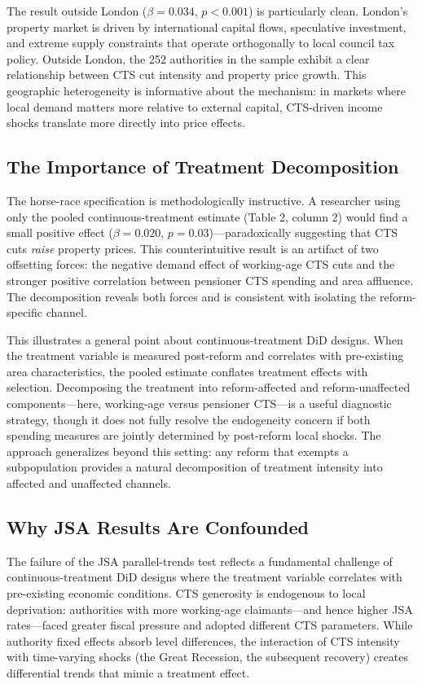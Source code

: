 \documentclass[12pt]{article}
\begin{document}
The result outside London ($\beta = 0.034$, $p < 0.001$) is particularly clean. London's property market is driven by international capital flows, speculative investment, and extreme supply constraints that operate orthogonally to local council tax policy. Outside London, the 252 authorities in the sample exhibit a clear relationship between CTS cut intensity and property price growth. This geographic heterogeneity is informative about the mechanism: in markets where local demand matters more relative to external capital, CTS-driven income shocks translate more directly into price effects.

\subsection{The Importance of Treatment Decomposition}

The horse-race specification is methodologically instructive. A researcher using only the pooled continuous-treatment estimate (Table 2, column 2) would find a small positive effect ($\beta = 0.020$, $p = 0.03$)---paradoxically suggesting that CTS cuts \textit{raise} property prices. This counterintuitive result is an artifact of two offsetting forces: the negative demand effect of working-age CTS cuts and the stronger positive correlation between pensioner CTS spending and area affluence. The decomposition reveals both forces and is consistent with isolating the reform-specific channel.

This illustrates a general point about continuous-treatment DiD designs. When the treatment variable is measured post-reform and correlates with pre-existing area characteristics, the pooled estimate conflates treatment effects with selection. Decomposing the treatment into reform-affected and reform-unaffected components---here, working-age versus pensioner CTS---is a useful diagnostic strategy, though it does not fully resolve the endogeneity concern if both spending measures are jointly determined by post-reform local shocks. The approach generalizes beyond this setting: any reform that exempts a subpopulation provides a natural decomposition of treatment intensity into affected and unaffected channels.

\subsection{Why JSA Results Are Confounded}

The failure of the JSA parallel-trends test reflects a fundamental challenge of continuous-treatment DiD designs where the treatment variable correlates with pre-existing economic conditions. CTS generosity is endogenous to local deprivation: authorities with more working-age claimants---and hence higher JSA rates---faced greater fiscal pressure and adopted different CTS parameters. While authority fixed effects absorb level differences, the interaction of CTS intensity with time-varying shocks (the Great Recession, the subsequent recovery) creates differential trends that mimic a treatment effect.
\end{document}
